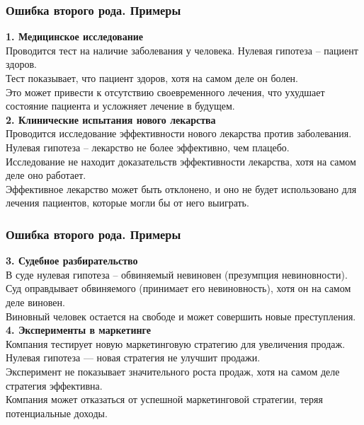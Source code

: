\documentclass[aspectratio=169]{beamer}
\begin{document}
\begin{frame}
\frametitle{Ошибка второго рода. Примеры}
{\bf 1. Медицинское исследование}\\
 Проводится тест на наличие заболевания у человека. Нулевая гипотеза -- пациент здоров.\\
 Тест показывает, что пациент здоров, хотя на самом деле он болен.\\
 Это может привести к отсутствию своевременного лечения, что ухудшает состояние пациента и усложняет лечение в будущем.
\newline\\
{\bf 2. Клинические испытания нового лекарства}\\
 Проводится исследование эффективности нового лекарства против заболевания. Нулевая гипотеза -- лекарство не более эффективно, чем плацебо.\\
 Исследование не находит доказательств эффективности лекарства, хотя на самом деле оно работает.\\
 Эффективное лекарство может быть отклонено, и оно не будет использовано для лечения пациентов, которые могли бы от него выиграть.
\end{frame}

\begin{frame}
\frametitle{Ошибка второго рода. Примеры}
{\bf  3. Судебное разбирательство}\\
 В суде нулевая гипотеза -- обвиняемый невиновен (презумпция невиновности).\\
 Суд оправдывает обвиняемого (принимает его невиновность), хотя он на самом деле виновен.\\
 Виновный человек остается на свободе и может совершить новые преступления.
\newline\\
{\bf  4. Эксперименты в маркетинге}\\
 Компания тестирует новую маркетинговую стратегию для увеличения продаж. Нулевая гипотеза — новая стратегия не улучшит продажи.\\
 Эксперимент не показывает значительного роста продаж, хотя на самом деле стратегия эффективна.\\
 Компания может отказаться от успешной маркетинговой стратегии, теряя потенциальные доходы.
\end{frame}
\end{document}
